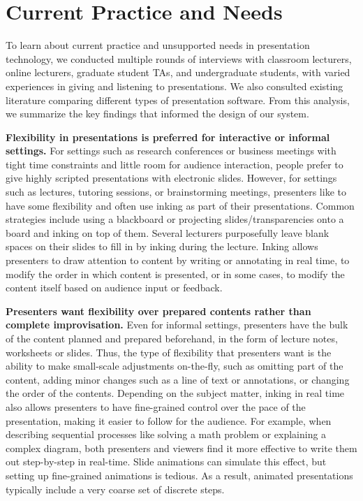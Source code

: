 \section{Current Practice and Needs}
To learn about current practice and unsupported needs in presentation technology, we conducted multiple rounds of interviews with classroom lecturers, online lecturers, graduate student TAs, and undergraduate students, with varied experiences in giving and listening to presentations. 
%
We also consulted existing literature comparing different types of presentation software.
%
From this analysis, we summarize the key findings that informed the design of our system.

\textbf{Flexibility in presentations is preferred for interactive or informal settings.} For settings such as research conferences or business meetings with tight time constraints and little room for audience interaction, people prefer to give highly scripted presentations with electronic slides. However, for settings such as lectures, tutoring sessions, or brainstorming meetings, presenters like to have some flexibility and often use inking as part of their presentations. Common strategies include using a blackboard or projecting slides/transparencies onto a board and inking on top of them. Several lecturers purposefully leave blank spaces on their slides to fill in by inking during the lecture. Inking allows presenters to draw attention to content by writing or annotating in real time, to modify the order in which content is presented, or in some cases, to modify the content itself based on audience input or feedback.

\textbf{Presenters want flexibility over prepared contents rather than complete improvisation.} Even for informal settings, presenters have the bulk of the content planned and prepared beforehand, in the form of lecture notes, worksheets or slides. Thus, the type of flexibility that presenters want is the ability to make small-scale adjustments on-the-fly, such as omitting part of the content, adding minor changes such as a line of text or annotations, or changing the order of the contents.  Depending on the subject matter, inking in real time also allows presenters to have fine-grained control over the pace of the presentation, making it easier to follow for the audience. For example, when describing sequential processes like solving a math problem or explaining a complex diagram, both presenters and viewers find it more effective to write them out step-by-step in real-time. Slide animations can simulate this effect, but setting up fine-grained animations is tedious. As a result, animated presentations typically include a very coarse set of discrete steps. 

